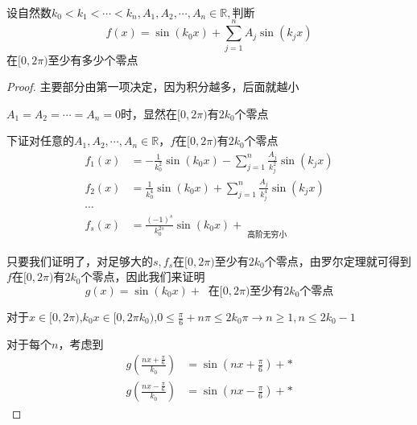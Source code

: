 \documentclass[lang=cn,10pt]{elegantbook}
\begin{document}
	\begin{example}
		$\text{设自然数}k_0<k_1<\cdots <k_n,A_1,A_2,\cdots ,A_n\in \mathbb{R} ,\text{判断}$
		\begin{equation*}
			f\left( x \right) =\sin \left( k_0x \right) +\sum_{j=1}^n{A_j\sin \left( k_jx \right)}
		\end{equation*}
		在$[0,2\pi)$至少有多少个零点
	\end{example}
	\begin{proof}
		
		主要部分由第一项决定，因为积分越多，后面就越小
		
		$A_{1}=A_{2}=\cdots=A_{n}=0$时，显然在$[0,2\pi)$有$2k_{0}$个零点
		
		下证对任意的$A_1,A_2,\cdots ,A_n\in \mathbb{R}$，$f$在$[0,2\pi)$有$2k_{0}$个零点
		\begin{equation*}
			\begin{aligned}
				f_1\left( x \right) &=-\frac{1}{k_{0}^{2}}\sin \left( k_0x \right) -\sum_{j=1}^n{\frac{A_j}{k_{j}^{2}}\sin \left( k_jx \right)}
				\\
				f_2\left( x \right) &=\frac{1}{k_{0}^{4}}\sin \left( k_0x \right) +\sum_{j=1}^n{\frac{A_j}{k_{j}^{4}}\sin \left( k_jx \right)}
				\\
				\cdots 
				\\
				f_s\left( x \right) &=\frac{\left( -1 \right) ^s}{k_{0}^{2s}}\sin \left( k_0x \right) +\mathop {\sum_{j=1}^n{\frac{\left( -1 \right) ^sA_j}{k_{j}^{2s}}\sin \left( k_jx \right)}} \limits_{\text{高阶无穷小}}
			\end{aligned}
		\end{equation*}
		
		只要我们证明了，对足够大的$s,f_{s}$在$[0,2\pi)$至少有$2k_{0}$个零点，由罗尔定理就可得到$f$在$[0,2\pi)$有$2k_{0}$个零点，因此我们来证明
		\begin{equation*}
			g\left( x \right) =\sin \left( k_0x \right) +\mathop {\sum_{j=1}^n{\frac{\left( -1 \right) ^sk_{0}^{2s}A_j}{k_{j}^{2s}}\sin \left( k_jx \right)}} \limits_{}\text{在[}0,2\pi )\text{至少有}2k_0\text{个零点}
		\end{equation*}
		
		对于$x\in[0,2\pi )$,$k_{0}x\in[0,2\pi k_{0} )$,$0\le \frac{\pi}{6}+n\pi \le 2k_0\pi \rightarrow n\ge 1,n\le 2k_0-1$
		
		对于每个$n$，考虑到
		\begin{equation*}
			\begin{aligned}
				g\left( \frac{nx+\frac{\pi}{6}}{k_0} \right) &=\sin \left( nx+\frac{\pi}{6} \right) +*
				\\
				g\left( \frac{nx-\frac{\pi}{6}}{k_0} \right) &=\sin \left( nx-\frac{\pi}{6} \right) +*
			\end{aligned}
		\end{equation*}
		

\end{proof}
\end{document}
